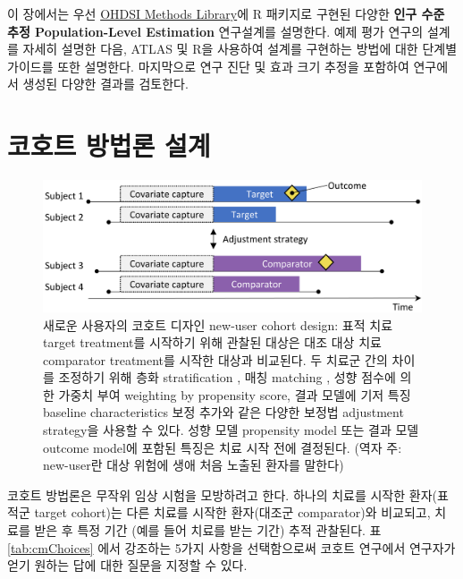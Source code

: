 \documentclass[10.5pt]{book}
\theoremstyle{definition}
\theoremstyle{definition}
\theoremstyle{definition}
\theoremstyle{remark}
\begin{document}
이 장에서는 우선 \href{https://ohdsi.github.io/MethodsLibrary/}{OHDSI
Methods Library}에 R 패키지로 구현된 다양한 \textbf{인구 수준 추정
Population-Level Estimation} 연구설계를 설명한다. 예제 평가 연구의
설계를 자세히 설명한 다음, ATLAS 및 R을 사용하여 설계를 구현하는 방법에
대한 단계별 가이드를 또한 설명한다. 마지막으로 연구 진단 및 효과 크기
추정을 포함하여 연구에서 생성된 다양한 결과를 검토한다.

\section{코호트 방법론 설계}\label{CohortMethod}


\begin{figure}

{\centering \includegraphics[width=0.9\linewidth]{images/PopulationLevelEstimation/cohortMethod} 

}

\caption{새로운 사용자의 코호트 디자인 new-user cohort design: 표적 치료 target treatment를 시작하기 위해 관찰된 대상은 대조 대상 치료 comparator treatment를 시작한 대상과 비교된다. 두 치료군 간의 차이를 조정하기 위해 층화 stratification , 매칭 matching , 성향 점수에 의한 가중치 부여 weighting by propensity score, 결과 모델에 기저 특징 baseline characteristics 보정 추가와 같은 다양한 보정법 adjustment strategy을 사용할 수 있다. 성향 모델 propensity model 또는 결과 모델 outcome model에 포함된 특징은 치료 시작 전에 결정된다. (역자 주: new-user란 대상 위험에 생애 처음 노출된 환자를 말한다) }\label{fig:cohortMethod}
\end{figure}

코호트 방법론은 무작위 임상 시험을 모방하려고 한다. \citep{hernan_2016}
하나의 치료를 시작한 환자(표적군 target cohort)는 다른 치료를 시작한
환자(대조군 comparator)와 비교되고, 치료를 받은 후 특정 기간 (예를 들어
치료를 받는 기간) 추적 관찰된다. 표 \ref{tab:cmChoices} 에서 강조하는
5가지 사항을 선택함으로써 코호트 연구에서 연구자가 얻기 원하는 답에 대한
질문을 지정할 수 있다. 
 
\end{document}
